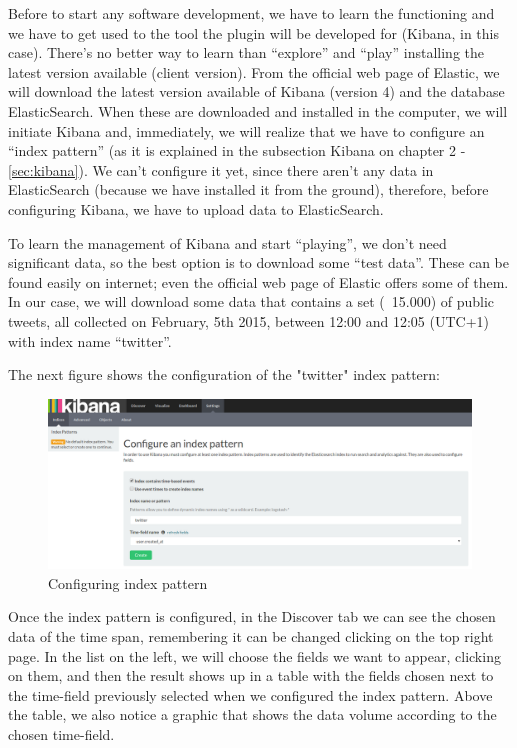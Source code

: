 \documentclass[a4paper, 12pt]{book}
\begin{document}
Before to start any software development, we have to learn the functioning and we have to get used to the tool the plugin will be developed for (Kibana, in this case). There’s no better way to learn than “explore” and “play” installing the latest version available (client version). From the official web page of Elastic, we will download the latest version available of Kibana (version 4) and the database ElasticSearch.  When these are downloaded and installed in the computer, we will initiate Kibana and, immediately, we will realize that we have to configure an “index pattern” (as it is explained in the subsection Kibana on chapter 2 - \ref{sec:kibana}). We can’t configure it yet, since there aren’t any data in ElasticSearch (because we have installed it from the ground), therefore, before configuring Kibana, we have to upload data to ElasticSearch.

To learn the management of Kibana and start “playing”, we don’t need significant data, so the best option is to download some “test data”. These can be found easily on internet; even the official web page of Elastic offers some of them. In our case, we will download some data that contains a set (~15.000) of public tweets, all collected on February, 5th 2015, between 12:00 and 12:05 (UTC+1) with index name “twitter”.

The next figure shows the configuration of the "twitter" index pattern:

\begin{figure}[H]
  \centering
  \includegraphics[width=15cm, keepaspectratio]{img/development/twitterindexpattern}
  \caption{Configuring index pattern}
  \label{fig:twitterindexpattern}
\end{figure}

Once the index pattern is configured, in the Discover tab we can see the chosen data of the time span, remembering it can be changed clicking on the top right page. In the list on the left, we will choose the fields we want to appear, clicking on them, and then the result shows up in a table with the fields chosen next to the time-field previously selected when we configured the index pattern. Above the table, we also notice a graphic that shows the data volume according to the chosen time-field.
\end{document}
